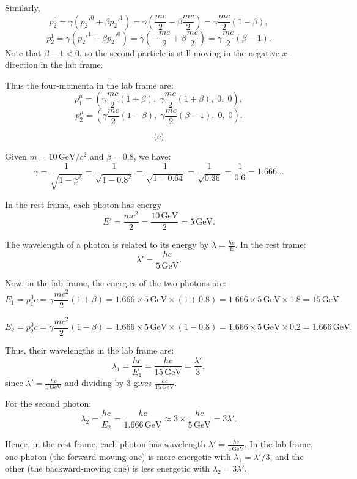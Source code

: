 \documentclass{article}
\begin{document}
Similarly,
\[
p_2^0 = \gamma \left(p_2'^0 + \beta p_2'^1\right) = \gamma\left(\frac{m c}{2} - \beta \frac{m c}{2}\right) = \gamma \frac{m c}{2}(1-\beta),
\]
\[
p_2^1 = \gamma \left(p_2'^1 + \beta p_2'^0\right) = \gamma\left(-\frac{m c}{2} + \beta \frac{m c}{2}\right) = \gamma \frac{m c}{2}(\beta -1).
\]
Note that \(\beta - 1 < 0\), so the second particle is still moving in the negative \(x\)-direction in the lab frame.

Thus the four-momenta in the lab frame are:
\[
p_1^\mu = \left(\gamma \frac{m c}{2}(1+\beta), \;\gamma \frac{m c}{2}(1+\beta), \;0, \;0\right),
\]
\[
p_2^\mu = \left(\gamma \frac{m c}{2}(1-\beta), \;\gamma \frac{m c}{2}(\beta -1), \;0, \;0\right).
\]

\[
\text{(c)}
\]

Given \(m = 10 \,\text{GeV}/c^2\) and \(\beta = 0.8\), we have:
\[
\gamma = \frac{1}{\sqrt{1-\beta^2}} = \frac{1}{\sqrt{1-0.8^2}} = \frac{1}{\sqrt{1-0.64}} = \frac{1}{\sqrt{0.36}} = \frac{1}{0.6} = 1.666\ldots
\]

In the rest frame, each photon has energy
\[
E' = \frac{m c^2}{2} = \frac{10\,\text{GeV}}{2} = 5\,\text{GeV}.
\]

The wavelength of a photon is related to its energy by \(\lambda = \frac{h c}{E}\). In the rest frame:
\[
\lambda' = \frac{h c}{5\,\text{GeV}}.
\]

Now, in the lab frame, the energies of the two photons are:
\[
E_1 = p_1^0 c = \gamma \frac{m c^2}{2}(1+\beta) = 1.666 \times 5\,\text{GeV} \times (1+0.8) = 1.666 \times 5\,\text{GeV} \times 1.8 = 15\,\text{GeV}.
\]

\[
E_2 = p_2^0 c = \gamma \frac{m c^2}{2}(1-\beta) = 1.666 \times 5\,\text{GeV} \times (1-0.8) = 1.666 \times 5\,\text{GeV} \times 0.2 = 1.666\,\text{GeV}.
\]

Thus, their wavelengths in the lab frame are:
\[
\lambda_1 = \frac{h c}{E_1} = \frac{h c}{15\,\text{GeV}} = \frac{\lambda'}{3},
\]
since \(\lambda' = \frac{h c}{5\,\text{GeV}}\) and dividing by 3 gives \(\frac{h c}{15\,\text{GeV}}\).

For the second photon:
\[
\lambda_2 = \frac{h c}{E_2} = \frac{h c}{1.666\,\text{GeV}} \approx 3 \times \frac{h c}{5\,\text{GeV}} = 3\lambda'.
\]

Hence, in the rest frame, each photon has wavelength \(\lambda' = \frac{h c}{5\,\text{GeV}}\). In the lab frame, one photon (the forward-moving one) is more energetic with \(\lambda_1 = \lambda'/3\), and the other (the backward-moving one) is less energetic with \(\lambda_2 = 3\lambda'\).
\end{document}
